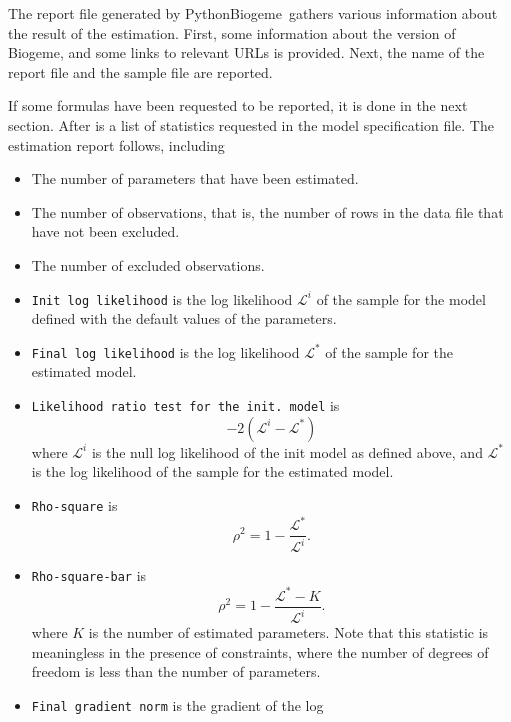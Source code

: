 \documentclass[12pt,a4paper]{article}
\newcommand{\PBIOGEME}{PythonBiogeme}
\begin{document}
The report file generated by \PBIOGEME\ gathers various information
about the result of the estimation. First, some information about the
version of Biogeme, and some links to relevant URLs is provided. 
Next, the name of the report file and the sample file are reported. 

If some formulas have been requested to be reported, it is done in the
next section. 
After is a list of statistics requested in the model specification
file.
The estimation report follows, including
   \begin{itemize}
      \item The number of parameters that have been estimated.
      \item The number of observations, that is, the number of rows in
        the data file  that have not been excluded.
      \item The number of excluded observations.
      \item \lstinline+Init log likelihood+ is the log likelihood
        $\mathcal{L}^i$ of
        the sample for the model defined with the default values of
        the parameters.
      \item \lstinline+Final log likelihood+ is the log likelihood
        $\mathcal{L}^*$ of the sample for the estimated model. 
      \item \lstinline+Likelihood ratio test for the init. model+ is 
         \begin{equation}
            -2 ( \mathcal{L}^i - \mathcal{L}^*)
         \end{equation}
         where 
         $ \mathcal{L}^i$ is the null log likelihood of the init model
         as defined above, and $\mathcal{L}^*$ is the log likelihood of the sample for the estimated model. 
      \item \lstinline+Rho-square+ is
         \begin{equation}
            \rho^2 = 1 - \frac{\mathcal{L}^*}{\mathcal{L}^i}.
         \end{equation}
        \item \lstinline+Rho-square-bar+ is
         \begin{equation}
            \rho^2 = 1 - \frac{\mathcal{L}^* - K}{\mathcal{L}^i}.
         \end{equation}
         where $K$ is the number of estimated parameters. Note that this statistic is meaningless in the presence of constraints, where the number of degrees of freedom is less than  the number of parameters. 
      \item \lstinline+Final gradient norm+ is the gradient of the log

\end{itemize}
\end{document}
